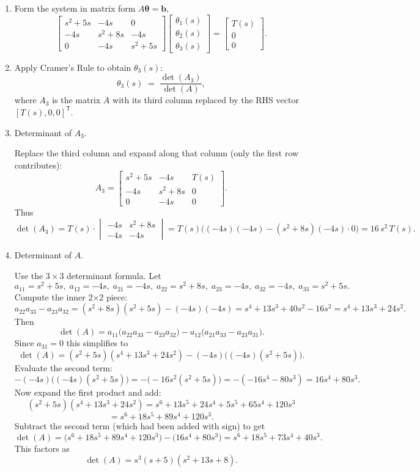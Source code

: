 \documentclass[11pt]{article}
\begin{document}
\begin{enumerate}[label=(\alph*), itemindent=*, leftmargin=*, nolistsep]
\item Form the system in matrix form \(A\boldsymbol{\theta} = \boldsymbol{b}\),
\[
\begin{bmatrix}
s^2 + 5s & -4s & 0 \\[6pt]
-4s & s^2 + 8s & -4s \\[6pt]
0 & -4s & s^2 + 5s
\end{bmatrix}
\begin{bmatrix}\theta_1(s)\\[4pt]\theta_2(s)\\[4pt]\theta_3(s)\end{bmatrix}
=
\begin{bmatrix}T(s)\\[4pt]0\\[4pt]0\end{bmatrix}.
\]

\item Apply Cramer's Rule to obtain \(\theta_3(s)\):
\[
\theta_3(s) \;=\; \frac{\det(A_3)}{\det(A)},
\]
where \(A_3\) is the matrix \(A\) with its third column replaced by the RHS vector \([T(s),0,0]^\mathsf{T}\).

\item Determinant of \(A_3\).

Replace the third column and expand along that column (only the first row contributes):
\[
A_3=\begin{bmatrix}
s^2+5s & -4s & T(s) \\[6pt]
-4s & s^2+8s & 0 \\[6pt]
0 & -4s & 0
\end{bmatrix}.
\]
Thus
\[
\det(A_3) = T(s)\cdot
\begin{vmatrix}
-4s & s^2+8s \\[4pt]
-4s & -4s
\end{vmatrix}
= T(s)\big((-4s)(-4s) - (s^2+8s)(-4s)\cdot 0\big)
= 16\,s^2\,T(s).
\]

\item Determinant of \(A\).

Use the \(3\times3\) determinant formula. Let
\[
a_{11}=s^2+5s,\; a_{12}=-4s,\; a_{21}=-4s,\; a_{22}=s^2+8s,\;
a_{23}=-4s,\; a_{32}=-4s,\; a_{33}=s^2+5s.
\]
Compute the inner 2×2 piece:
\[
a_{22}a_{33}-a_{23}a_{32} = (s^2+8s)(s^2+5s) - (-4s)(-4s)
= s^4 + 13s^3 + 40s^2 - 16s^2
= s^4 + 13s^3 + 24s^2.
\]
Then
\[
\det(A) = a_{11}\big(a_{22}a_{33}-a_{23}a_{32}\big)
- a_{12}\big(a_{21}a_{33}-a_{23}a_{31}\big).
\]
Since \(a_{31}=0\) this simplifies to
\[
\det(A) = (s^2+5s)(s^4 + 13s^3 + 24s^2) - (-4s)\big((-4s)(s^2+5s)\big).
\]
Evaluate the second term:
\[
-(-4s)\big((-4s)(s^2+5s)\big) = -\big(-16 s^2 (s^2+5s)\big) = -(-16 s^4 - 80 s^3)
= 16 s^4 + 80 s^3.
\]
Now expand the first product and add:
\[
(s^2+5s)(s^4 + 13s^3 + 24s^2)
= s^6 + 13s^5 + 24s^4 + 5s^5 + 65s^4 + 120s^3
\]
\[
= s^6 + 18s^5 + 89s^4 + 120s^3.
\]
Subtract the second term (which had been added with sign) to get
\[
\det(A) = \big(s^6 + 18s^5 + 89s^4 + 120s^3\big) - \big(16s^4 + 80s^3\big)
= s^6 + 18s^5 + 73s^4 + 40s^3.
\]
This factors as
\[
\det(A) = s^3 (s+5)(s^2 + 13s + 8).
\]


\end{enumerate}
\end{document}
